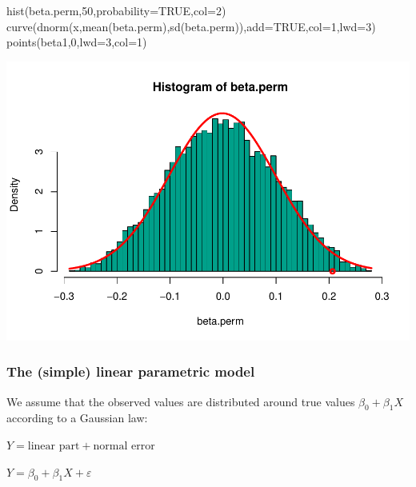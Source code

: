 \documentclass[
]{article}
\newenvironment{Shaded}{\begin{snugshade}}{\end{snugshade}}
\newcommand{\AttributeTok}[1]{\textcolor[rgb]{0.77,0.63,0.00}{#1}}
\newcommand{\ConstantTok}[1]{\textcolor[rgb]{0.00,0.00,0.00}{#1}}
\newcommand{\DecValTok}[1]{\textcolor[rgb]{0.00,0.00,0.81}{#1}}
\newcommand{\FunctionTok}[1]{\textcolor[rgb]{0.00,0.00,0.00}{#1}}
\newcommand{\NormalTok}[1]{#1}
\begin{document}
\begin{Shaded}
\begin{Highlighting}[]
\FunctionTok{hist}\NormalTok{(beta.perm,}\DecValTok{50}\NormalTok{,}\AttributeTok{probability=}\ConstantTok{TRUE}\NormalTok{,}\AttributeTok{col=}\DecValTok{2}\NormalTok{)}
\FunctionTok{curve}\NormalTok{(}\FunctionTok{dnorm}\NormalTok{(x,}\FunctionTok{mean}\NormalTok{(beta.perm),}\FunctionTok{sd}\NormalTok{(beta.perm)),}\AttributeTok{add=}\ConstantTok{TRUE}\NormalTok{,}\AttributeTok{col=}\DecValTok{1}\NormalTok{,}\AttributeTok{lwd=}\DecValTok{3}\NormalTok{)}
\FunctionTok{points}\NormalTok{(beta1,}\DecValTok{0}\NormalTok{,}\AttributeTok{lwd=}\DecValTok{3}\NormalTok{,}\AttributeTok{col=}\DecValTok{1}\NormalTok{)}
\end{Highlighting}
\end{Shaded}

\begin{center}\includegraphics{perm_files/figure-latex/unnamed-chunk-17-1} \end{center}

\hypertarget{the-simple-linear-parametric-model}{%
\subsubsection{The (simple) linear parametric
model}\label{the-simple-linear-parametric-model}}

We assume that the observed values are distributed around true values
\(\beta_0 + \beta_1 X\) according to a Gaussian law:

\(Y=\textrm{linear part} + \textrm{normal error}\)

\(Y=\beta_0 + \beta_1 X + \varepsilon\)
\end{document}
